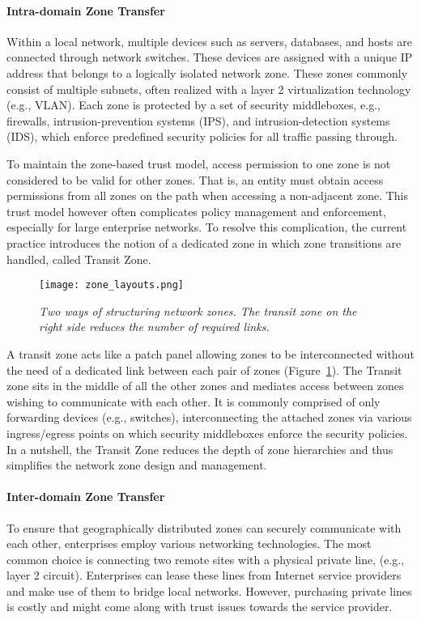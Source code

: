 \paragraph{Intra-domain Zone Transfer}
Within a local network, multiple devices such as servers, databases, and hosts are connected
through network switches. These devices are assigned with a unique IP address that belongs
to a logically isolated network zone. These zones commonly consist of multiple subnets,
often realized with a layer 2 virtualization technology (e.g., VLAN). Each zone is protected
by a set of security middleboxes, e.g., firewalls, intrusion-prevention systems (IPS),
and intrusion-detection systems (IDS), which enforce predefined security policies for all
traffic passing through.

To maintain the zone-based trust model, access permission to one zone is not considered to be
valid for other zones. That is, an entity must obtain access permissions from all zones on the
path when accessing a non-adjacent zone. This trust model however often complicates policy management
and enforcement, especially for large enterprise networks.
To resolve this complication, the current practice introduces the notion of a dedicated zone in which zone
transitions are handled, called Transit Zone.

\begin{figure}[htb]
	\begin{center}
		\texttt{[image: zone\_layouts.png]}
	\end{center}
	\caption{\textit{Two ways of structuring network zones. The transit zone on the right side reduces
	the number of required links.}}
	\label{fig:zone_layout}
\end{figure}

A transit zone acts like a patch panel allowing zones to be interconnected without the need
of a dedicated link between each pair of zones (Figure~\ref{fig:zone_layout}).
The Transit zone sits in the middle of all
the other zones and mediates access between zones wishing to communicate with each other.
It is commonly comprised of only forwarding devices (e.g., switches), interconnecting the
attached zones via various ingress/egress points on which security middleboxes enforce the
security policies. In a nutshell, the Transit Zone reduces the depth of zone hierarchies and
thus simplifies the network zone design and management.

\paragraph{Inter-domain Zone Transfer}
To ensure that geographically distributed zones can securely communicate with each other,
enterprises employ various networking technologies. The most common choice is connecting
two remote sites with a physical private line, (e.g., layer 2 circuit). Enterprises
can lease these lines from Internet service providers and make use of them to bridge local
networks. However, purchasing private lines is costly and might come along
with trust issues towards the service provider.

